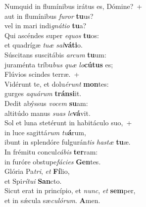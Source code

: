 \evenverse Numquid in flumínibus irátus es, Dómine?~+\\\evenverse  aut in flumínibus \textit{fu}\textit{ror} \textbf{tu}us?~\*\\
\evenverse vel in mari indi\textit{gná}\textit{ti}\textit{o} \textbf{tu}a?\\
\oddverse Qui ascéndes super \textit{e}\textit{quos} \textbf{tu}os:~\*\\
\oddverse et quadrígæ \textit{tu}\textit{æ} \textit{sal}\textbf{vá}\textbf{ti}o.\\
\evenverse Súscitans suscitábis \textit{ar}\textit{cum} \textbf{tu}um:~\*\\
\evenverse juraménta tríbu\textit{bus} \textit{quæ} \textit{lo}\textbf{cú}\textbf{tus} es;\\
\oddverse Flúvios scindes terræ.~+\\
\oddverse  Vidérunt te, et dolu\textit{é}\textit{runt} \textbf{mon}tes:~\*\\
\oddverse gurges \textit{a}\textit{quá}\textit{rum} \textbf{trán}\textbf{si}it.\\
\evenverse Dedit abýssus \textit{vo}\textit{cem} \textbf{su}am:~\*\\
\evenverse altitúdo manus \textit{su}\textit{as} \textit{le}\textbf{vá}vit.\\
\oddverse Sol et luna stetérunt in habitáculo suo,~+\\
\oddverse  in luce sagittá\textit{rum} \textit{tu}\textbf{á}rum,~\*\\
\oddverse ibunt in splendóre fulgurán\textit{tis} \textit{ha}\textit{stæ} \textbf{tu}æ.\\
\evenverse In frémitu concul\textit{cá}\textit{bis} \textbf{ter}ram:~\*\\
\evenverse in furóre obstupe\textit{fá}\textit{ci}\textit{es} \textbf{Gen}tes.\\
\oddverse Glória Pa\textit{tri}, \textit{et} \textbf{Fí}lio,~\*\\
\oddverse et Spi\textit{rí}\textit{tu}\textit{i} \textbf{San}cto.\\
\evenverse Sicut erat in princípio, et \textit{nunc}, \textit{et} \textbf{sem}per,~\*\\
\evenverse et in sǽcula sæ\textit{cu}\textit{ló}\textit{rum}. \textbf{A}men.\\
